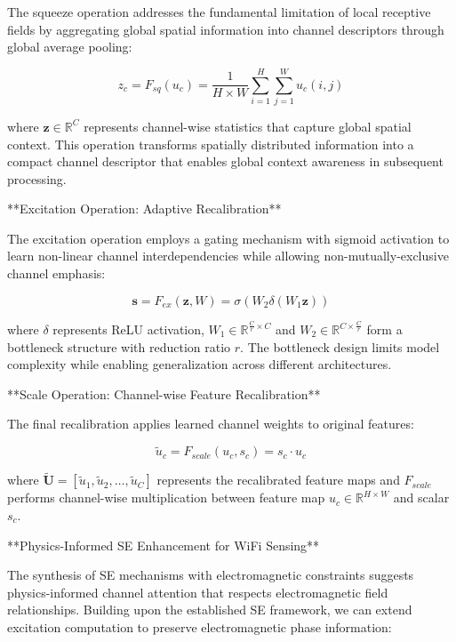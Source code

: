\documentclass[journal]{IEEEtran}
\begin{document}
{The squeeze operation addresses the fundamental limitation of local receptive fields by aggregating global spatial information into channel descriptors through global average pooling:

\begin{equation}
z_c = F_{sq}(u_c) = \frac{1}{H \times W} \sum_{i=1}^{H} \sum_{j=1}^{W} u_c(i,j)
\label{eq:se_squeeze}
\end{equation}

where $\mathbf{z} \in \mathbb{R}^C$ represents channel-wise statistics that capture global spatial context. This operation transforms spatially distributed information into a compact channel descriptor that enables global context awareness in subsequent processing.

**Excitation Operation: Adaptive Recalibration**

The excitation operation employs a gating mechanism with sigmoid activation to learn non-linear channel interdependencies while allowing non-mutually-exclusive channel emphasis:

\begin{equation}
\mathbf{s} = F_{ex}(\mathbf{z}, W) = \sigma(W_2\delta(W_1\mathbf{z}))
\label{eq:se_excitation}
\end{equation}

where $\delta$ represents ReLU activation, $W_1 \in \mathbb{R}^{\frac{C}{r} \times C}$ and $W_2 \in \mathbb{R}^{C \times \frac{C}{r}}$ form a bottleneck structure with reduction ratio $r$. The bottleneck design limits model complexity while enabling generalization across different architectures.

**Scale Operation: Channel-wise Feature Recalibration**

The final recalibration applies learned channel weights to original features:

\begin{equation}
\tilde{u}_c = F_{scale}(u_c, s_c) = s_c \cdot u_c
\label{eq:se_scale}
\end{equation}

where $\tilde{\mathbf{U}} = [\tilde{u}_1, \tilde{u}_2, \ldots, \tilde{u}_C]$ represents the recalibrated feature maps and $F_{scale}$ performs channel-wise multiplication between feature map $u_c \in \mathbb{R}^{H \times W}$ and scalar $s_c$.

**Physics-Informed SE Enhancement for WiFi Sensing**

The synthesis of SE mechanisms with electromagnetic constraints suggests physics-informed channel attention that respects electromagnetic field relationships. Building upon the established SE framework, we can extend excitation computation to preserve electromagnetic phase information:

}
\end{document}

